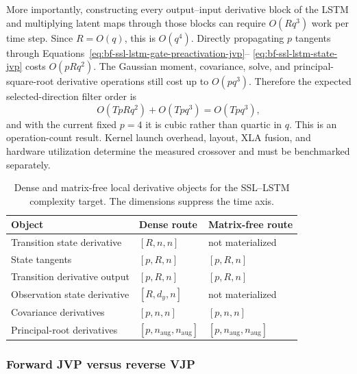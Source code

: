 More importantly, constructing every output--input derivative block of the
LSTM and multiplying latent maps through those blocks can require
$O(Rq^3)$ work per time step.  Since $R=O(q)$, this is $O(q^4)$.  Directly
propagating $p$ tangents through
Equations~\eqref{eq:bf-ssl-lstm-gate-preactivation-jvp}--
\eqref{eq:bf-ssl-lstm-state-jvp} costs $O(pRq^2)$.  The Gaussian moment,
covariance, solve, and principal-square-root derivative operations still cost
up to $O(pq^3)$.  Therefore the expected selected-direction filter order is
\begin{equation}
  O(TpRq^2)+O(Tpq^3)=O(Tpq^3),
  \label{eq:bf-ssl-lstm-matrix-free-selected-order}
\end{equation}
and with the current fixed $p=4$ it is cubic rather than quartic in $q$.
This is an operation-count result.  Kernel launch overhead, layout, XLA
fusion, and hardware utilization determine the measured crossover and must be
benchmarked separately.

\begin{table}[tbp]
  \centering
  \caption{Dense and matrix-free local derivative objects for the SSL--LSTM
  complexity target.  The dimensions suppress the time axis.}
  \label{tab:bf-ssl-lstm-matrix-free-shapes}
  \begin{tabular}{lll}
    \toprule
    Object & Dense route & Matrix-free route \\
    \midrule
    Transition state derivative & $[R,n,n]$ & not materialized \\
    State tangents & $[p,R,n]$ & $[p,R,n]$ \\
    Transition derivative output & $[p,R,n]$ & $[p,R,n]$ \\
    Observation state derivative & $[R,d_y,n]$ & not materialized \\
    Covariance derivatives & $[p,n,n]$ & $[p,n,n]$ \\
    Principal-root derivatives & $[p,n_{\mathrm{aug}},n_{\mathrm{aug}}]$
      & $[p,n_{\mathrm{aug}},n_{\mathrm{aug}}]$ \\
    \bottomrule
  \end{tabular}
\end{table}

\subsubsection{Forward JVP versus reverse VJP}

